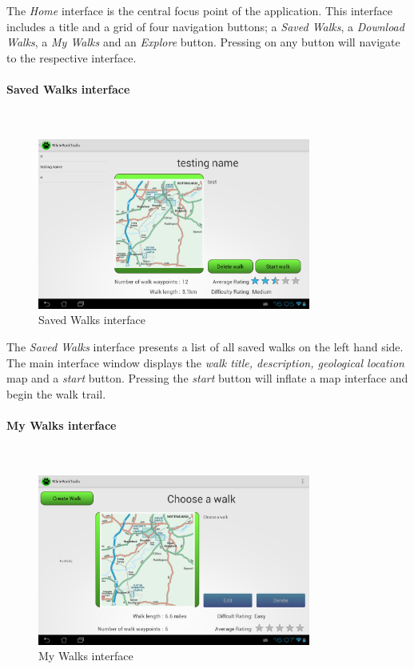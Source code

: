 \documentclass[11pt,a4paper]{report}
\begin{document}
The \emph{Home} interface is the central focus point of the application. This interface includes a title and a grid of four navigation buttons; a \emph{Saved Walks}, a \emph{Download Walks}, a \emph{My Walks} and an \emph{Explore} button. Pressing on any button will navigate to the respective interface.

\paragraph*{Saved Walks interface}\mbox{}\\
\begin{figure}[H]
    \centering
    \includegraphics[width=0.8\textwidth]{chris/saved_walks}
    \caption{Saved Walks interface}
    \label{fig:saved_walks}
\end{figure}

The \emph{Saved Walks} interface presents a list of all saved walks on the left hand side. The main interface window displays the \emph{walk title, description, geological location} map and a \emph{start} button. Pressing the \emph{start} button will inflate a map interface and begin the walk trail.

\paragraph*{My Walks interface}\mbox{}\\

\begin{figure}[H]
    \centering
    \includegraphics[width=0.8\textwidth]{chris/my_walks}
    \caption{My Walks interface}
    \label{fig:my_walks}
\end{figure}
\end{document}
